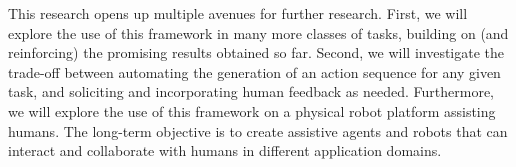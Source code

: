 \vspace{-0.75em}
This research opens up multiple avenues for further research. First, we will explore the use of this framework in many more classes of tasks, building on (and reinforcing) the promising results obtained so far.  Second, we will investigate the trade-off between automating the generation of an action sequence for any given task, and soliciting and incorporating human feedback as needed. Furthermore, we will explore the use of this framework on a physical robot platform assisting humans. The long-term objective is to create assistive agents and robots that can interact and collaborate with humans in different application domains.
